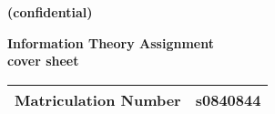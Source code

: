 \documentclass[12pt]{article}
\newcommand{\MyMatriculationNumber}{s0840844}  %
\begin{document}
\noindent
{\large\bf (confidential)}

\vspace*{30mm}

\begin{center}
  \LARGE\bf Information Theory Assignment\\
  cover sheet
\end{center}

\vspace{30mm}

\begin{center}
  \Large
  \begin{tabular}{|c|c|} \hline
    Matriculation Number & \MyMatriculationNumber\\\hline
    
  \end{tabular}
\end{center}
\end{document}
